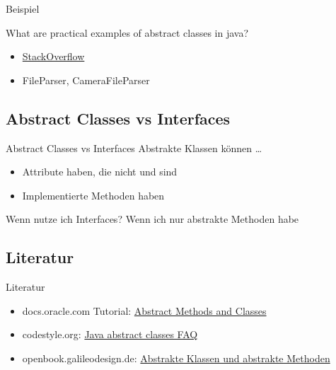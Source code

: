 \documentclass[usepdftitle=false,hyperref={pdfpagelabels=false}]{beamer}
\begin{document}
\begin{frame}{Beispiel}
    \begin{block}{What are practical examples of abstract classes in java?}
        \begin{itemize}
            \item \href{http://stackoverflow.com/a/1509826/562769}{StackOverflow}
            \item FileParser, CameraFileParser
        \end{itemize}
    \end{block}
\end{frame}

\subsection{Abstract Classes vs Interfaces}
\begin{frame}{Abstract Classes vs Interfaces}
    Abstrakte Klassen können \dots
    \begin{itemize}
        \item Attribute haben, die nicht  und  sind
        \item Implementierte Methoden haben
    \end{itemize}

    \begin{block}{Wenn nutze ich Interfaces?}
        Wenn ich nur abstrakte Methoden habe
    \end{block}
\end{frame}



\subsection{Literatur}
\begin{frame}{Literatur}
    \begin{itemize}
        \item docs.oracle.com Tutorial: \href{http://docs.oracle.com/javase/tutorial/java/IandI/abstract.html}{Abstract Methods and Classes}
        \item codestyle.org: \href{http://www.codestyle.org/java/faq-Abstract.shtml}{Java abstract classes FAQ}
        \item openbook.galileodesign.de: \href{http://openbook.galileodesign.de/javainsel5/javainsel06_009.htm\#Rxx747java06009040001EA1F04F100}{Abstrakte Klassen und abstrakte Methoden}
    \end{itemize}
\end{frame}
\end{document}

